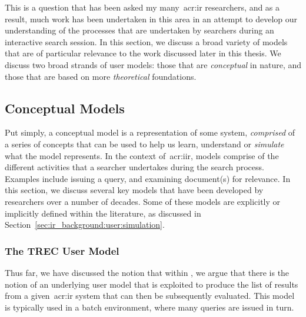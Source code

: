 This is a question that has been asked my many~\gls{acr:ir} researchers, and as a result, much work has been undertaken in this area in an attempt to develop our understanding of the processes that are undertaken by searchers during an interactive search session. In this section, we discuss a broad variety of models that are of particular relevance to the work discussed later in this thesis. We discuss two broad strands of user models: those that are \emph{conceptual} in nature, and those that are based on more \emph{theoretical} foundations.

%
%
%

\subsection{Conceptual Models}
Put simply, a conceptual model is a representation of some system, \emph{comprised} of a series of concepts that can be used to help us learn, understand or \emph{simulate} what the model represents. In the context of~\gls{acr:iir}, models comprise of the different activities that a searcher undertakes during the search process. Examples include issuing a query, and examining document(s) for relevance. In this section, we discuss several key models that have been developed by researchers over a number of decades. Some of these models are explicitly or implicitly defined within the literature, as discussed in Section~\ref{sec:ir_background:user:simulation}.

\subsubsection{The TREC User Model}\label{sec:stopping_background:models:conceptual:trec}
Thus far, we have discussed the notion that within , we argue that there is the notion of an underlying user model that is exploited to produce the list of results from a given~\gls{acr:ir} system that can then be subsequently evaluated. This model is typically used in a batch environment, where many queries are issued in turn.

